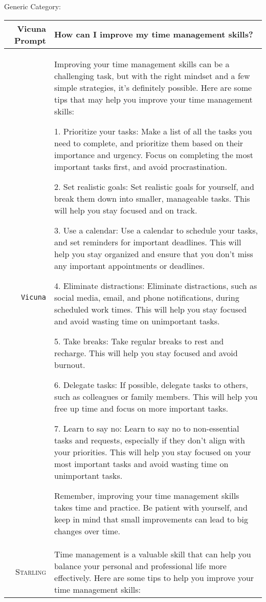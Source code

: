 \documentclass{article}
\newlength\mydepth
\newcommand{\starlingemojititle}{\textsc{Starling}\raisebox{-\mydepth}{\texttt{[image: images/starling-final.png]}}}
\begin{document}
{\newpage

Generic Category:

{  \footnotesize \begin{tabularx}{\linewidth}{r X} \toprule Vicuna Prompt  & {\bf How can I improve my time management skills?}
\\
 \midrule \texttt{Vicuna}  &
Improving your time management skills can be a challenging task, but with the right mindset and a few simple strategies, it's definitely possible. Here are some tips that may help you improve your time management skills:

1. Prioritize your tasks: Make a list of all the tasks you need to complete, and prioritize them based on their importance and urgency. Focus on completing the most important tasks first, and avoid procrastination.

2. Set realistic goals: Set realistic goals for yourself, and break them down into smaller, manageable tasks. This will help you stay focused and on track.

3. Use a calendar: Use a calendar to schedule your tasks, and set reminders for important deadlines. This will help you stay organized and ensure that you don't miss any important appointments or deadlines.

4. Eliminate distractions: Eliminate distractions, such as social media, email, and phone notifications, during scheduled work times. This will help you stay focused and avoid wasting time on unimportant tasks.

5. Take breaks: Take regular breaks to rest and recharge. This will help you stay focused and avoid burnout.

6. Delegate tasks: If possible, delegate tasks to others, such as colleagues or family members. This will help you free up time and focus on more important tasks.

7. Learn to say no: Learn to say no to non-essential tasks and requests, especially if they don't align with your priorities. This will help you stay focused on your most important tasks and avoid wasting time on unimportant tasks.

Remember, improving your time management skills takes time and practice. Be patient with yourself, and keep in mind that small improvements can lead to big changes over time.
\\
 \midrule \starlingemojititle{}  &
Time management is a valuable skill that can help you balance your personal and professional life more effectively. Here are some tips to help you improve your time management skills:


\end{tabularx}}}
\end{document}
